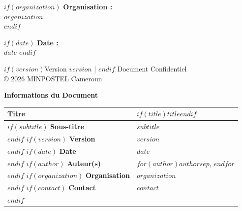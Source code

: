 \documentclass[11pt,a4paper]{report}
\begin{document}
\begin{titlepage}
\begin{center}
\begin{tcolorbox}[
      width=0.8\textwidth,
      colback=white,
      colframe=sonah-blue,
      arc=5mm,
      boxrule=1pt
    ]
      $if(organization)$
      {\bfseries Organisation :}\\
      $organization$\\
      \vspace{0.2cm}
      $endif$

      $if(date)$
      {\bfseries Date :}\\
      $date$
      $endif$
    \end{tcolorbox}

    \vfill

    {\small\color{sonah-gray}
      $if(version)$Version $version$ | $endif$
      Document Confidentiel\\
      © 2026 MINPOSTEL Cameroun
    }
  \end{center}
\end{titlepage}


\newpage
\thispagestyle{empty}
\mbox{}


\newpage
\thispagestyle{empty}

\vspace*{2cm}

\begin{center}
  {\LARGE\bfseries\color{sonah-blue} Informations du Document}
\end{center}

\vspace{1cm}

\begin{tabular}{@{}ll@{}}
  \toprule
  \textbf{Titre} & $if(title)$$title$$endif$ \\
  \midrule
  $if(subtitle)$
  \textbf{Sous-titre} & $subtitle$ \\
  \midrule
  $endif$
  $if(version)$
  \textbf{Version} & $version$ \\
  \midrule
  $endif$
  $if(date)$
  \textbf{Date} & $date$ \\
  \midrule
  $endif$
  $if(author)$
  \textbf{Auteur(s)} & $for(author)$$author$$sep$, $endfor$ \\
  \midrule
  $endif$
  $if(organization)$
  \textbf{Organisation} & $organization$ \\
  \midrule
  $endif$
  $if(contact)$
  \textbf{Contact} & $contact$ \\
  $endif$
  \bottomrule
\end{tabular}
\end{document}
